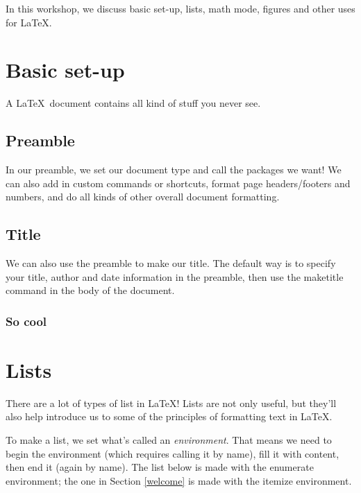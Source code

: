 \documentclass{article}
\begin{document}
In this workshop, we discuss basic set-up, lists, math mode, figures and other uses for \LaTeX.

\section{Basic set-up}

A \LaTeX\ document contains all kind of stuff you never see. 

\subsection{Preamble}

In our preamble, we set our document type and call the packages we want! We can also add in custom commands or shortcuts, format page headers/footers and numbers, and do all kinds of other overall document formatting.

\subsection{Title}

We can also use the preamble to make our title. The default way is to specify your title, author and date information in the preamble, then use the maketitle command in the body of the document. 

\subsubsection{So cool}

\section{Lists}

There are a lot of types of list in \LaTeX! Lists are not only useful, but they'll also help introduce us to some of the principles of formatting text in \LaTeX. 

To make a list, we set what's called an \emph{environment}. That means we need to begin the environment (which requires calling it by name), fill it with content, then end it (again by name). The list below is made with the enumerate environment; the one in Section \ref{welcome} is made with the itemize environment.

\end{document}
